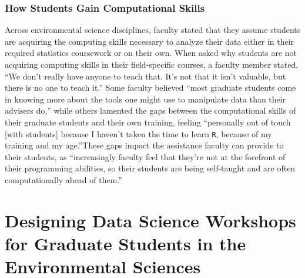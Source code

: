 \documentclass[12pt]{article}
\begin{document}
\subsubsection{How Students Gain Computational Skills}

\quad Across environmental science disciplines, faculty stated that they 
assume students are acquiring the computing skills necessary to analyze their 
data either in their required statistics coursework or on their own. When asked
why students are not acquiring computing skills in their field-specific courses,
a faculty member stated, ``We don't really have anyone to teach that. It's not
that it isn't valuable, but there is no one to teach it.'' Some faculty believed
``most graduate students come in knowing more about the tools one might use to
manipulate data than their advisers do,'' while others lamented the gaps between
the computational skills of their graduate students and their own training,
feeling ``personally out of touch [with students] because I haven't taken the
time to learn \texttt{R}, because of my training and my age.''These gaps impact
the assistance faculty can provide to their students, as ``increasingly faculty
feel that they're not at the forefront of their programming abilities, so their
students are being self-taught and are often computationally ahead of them.''


\section{Designing Data Science Workshops for Graduate Students in the 
Environmental Sciences}
\label{sec:workshops}
\end{document}
